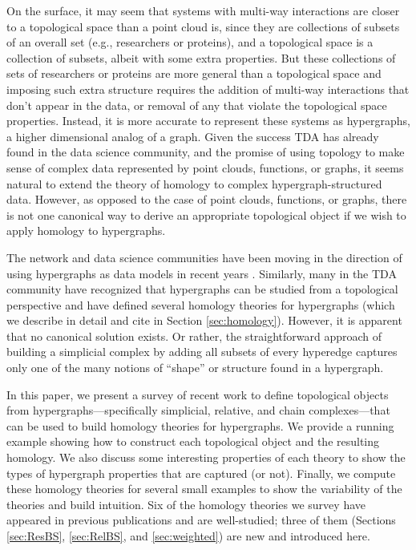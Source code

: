 \documentclass{amsart}
\begin{document}
On the surface, it may seem that systems with multi-way interactions are closer to a topological space than a point cloud is, since they are collections of subsets of an overall set (e.g., researchers or proteins), and a topological space is a collection of subsets, albeit with some extra properties.
But these collections of sets of researchers or proteins are more general than a topological space and imposing such extra structure requires the addition of multi-way interactions that don't appear in the data, or removal of any that violate the topological space properties.
Instead, it is more accurate to represent these systems as hypergraphs, a higher dimensional analog of a graph.
Given the success TDA has already found in the data science community, and the promise of using topology to make sense of complex data represented by point clouds, functions, or graphs, it seems natural to extend the theory of homology to complex hypergraph-structured data.
However, as opposed to the case of point clouds, functions, or graphs, there is not one canonical way to derive an appropriate topological object if we wish to apply homology to hypergraphs.

The network and data science communities have been moving in the direction of using hypergraphs as data models in recent years \cite{aksoy_hypernetwork_2020,juul2024hypergraph,sharma2020thesis,traversa2023robustness}.
Similarly, many in the TDA community have recognized that hypergraphs can be studied from a topological perspective and have defined several homology theories for hypergraphs (which we describe in detail and cite in Section \ref{sec:homology}). 
However, it is apparent that no canonical solution exists.
Or rather, the straightforward approach of building a simplicial complex by adding all subsets of every hyperedge captures only one of the many notions of ``shape'' or structure found in a hypergraph.

In this paper, we present a survey of recent work to define topological objects from hypergraphs---specifically simplicial, relative, and chain complexes---that can be used to build homology theories for hypergraphs.
We provide a running example showing how to construct each topological object and the resulting homology.
We also discuss some interesting properties of each theory to show the types of hypergraph properties that are captured (or not).
Finally, we compute these homology theories for several small examples to show the variability of the theories and build intuition.
Six of the homology theories we survey have appeared in previous publications and are well-studied; three of them (Sections \ref{sec:ResBS}, \ref{sec:RelBS}, and \ref{sec:weighted}) are new and introduced here.
\end{document}
